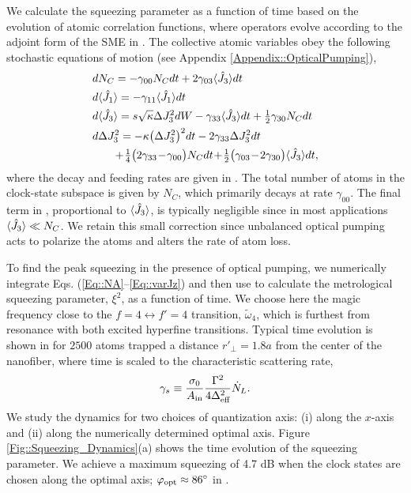 \documentclass[aps,pra,twocolumn]{revtex4-1} %
\newcommand{\varz}{\Delta J_3^2}
\newcommand{\qangle}{\varphi}
\newcommand{\magic}[1]{\tilde{\omega}_{#1}}
\begin{document}
We calculate the squeezing parameter as a function of time based on the evolution of atomic correlation functions, where operators evolve according to the adjoint form of the SME in .  The collective atomic variables obey the following stochastic equations of motion (see Appendix \ref{Appendix::OpticalPumping}),
\begin{subequations}\label{Eq::collectivedynamics}
	\begin{align} 
		&d N_C = -\gamma_{00} N_C dt + 2\gamma_{03} \expt{\hat{J}_3} dt \label{Eq::NA}\\
		&d \expt{\hat{J}_1}  = -\gamma_{11} \expt{\hat{J}_1} dt  \label{Eq::MeanSpinDecay} \\
		&d \expt{\hat{J}_3}  = s\sqrt{\kappa} \varz dW -\gamma_{33} \expt{\hat{J}_3}dt + \smallfrac{1}{2}\gamma_{30} N_C dt   \\
		&d \varz  = - \kappa \big(\varz\big)^2 dt- 2 \gamma_{33} \varz dt \nn\\
		&\quad\quad \!+\! \smallfrac{1}{4} \big( 2\gamma_{33}\!-\!\gamma_{00} \big) N_C dt \!+\! \smallfrac{1}{2} \big( \gamma_{03} \!-\! 2 \gamma_{30} \big) \expt{\hat{J}_3} dt,   \label{Eq::varJz} 
	\end{align}
\end{subequations}
where the decay and feeding rates are given in .
The total number of atoms in the clock-state subspace is given by $N_C$, which primarily decays at rate $\gamma_{00}$. 
The final term in , proportional to $\langle{\hat{J}_3}\rangle$, is typically negligible since in most applications $\langle{\hat{J}_3}\rangle \ll N_C$.  
We retain this small correction since unbalanced optical pumping acts to polarize the atoms and alters the rate of atom loss.  

To find the peak squeezing in the presence of optical pumping, we numerically integrate Eqs. (\ref{Eq::NA}--\ref{Eq::varJz}) and then use  to calculate the metrological squeezing parameter, $\xi^2$, as a function of time. 
We choose here the magic frequency close to the $ f=4\leftrightarrow f'=4 $ transition, $ \magic{4} $, which is furthest from resonance with both excited hyperfine transitions. 
Typical time evolution is shown in  for $2500$ atoms trapped a distance $r'\!_\perp=1.8a$ from the center of the nanofiber, where time is scaled to the characteristic scattering rate, 
\begin{align}\label{Eq::gamma_s}
\gamma_s \equiv \frac{\sigma_0}{A_{\rm in}}\frac{\Gamma^2}{4 \Delta_{\text{eff}}^2} \dot{N}_L .
\end{align}  
We study the dynamics for two choices of quantization axis: (i) along the $x$-axis and (ii) along the numerically determined optimal axis.  Figure \ref{Fig::Squeezing_Dynamics}(a) shows the time evolution of the squeezing parameter.  We achieve a maximum squeezing of 4.7 dB when the clock states are chosen along the optimal axis; $\qangle_{\rm opt} \approx 86^\circ$ in . 
\end{document}
